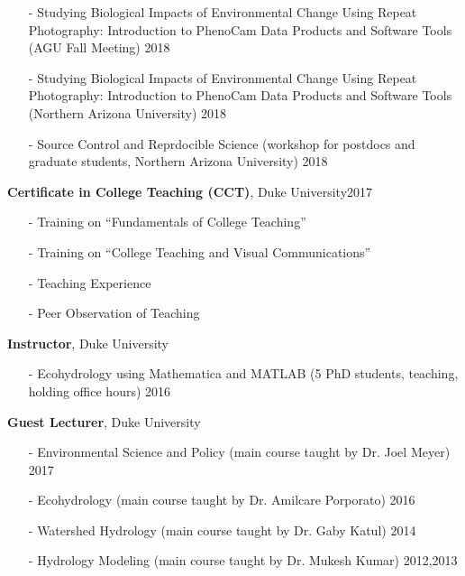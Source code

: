 \documentclass[10pt]{article}
\newenvironment{changemargin}[2]{%
  \begin{list}{}{%
    \setlength{\topsep}{0pt}%
    \setlength{\leftmargin}{#1}%
    \setlength{\rightmargin}{#2}%
    \setlength{\listparindent}{\parindent}%
    \setlength{\itemindent}{\parindent}%
    \setlength{\parsep}{\parskip}%
  }%
  \item[]}{\end{list}
}
\newenvironment{body} {
	\vspace*{-2pt}
	\begin{changemargin}{-0.5in}{-0.5in}
  }
	{\end{changemargin}
}
\begin{document}
\begin{body}
\begin{itemize}
  		\item[-]Studying Biological Impacts of Environmental Change Using Repeat Photography: Introduction to PhenoCam Data Products and Software Tools (AGU Fall Meeting)  \hfill {2018}
  		
  		\item[-]Studying Biological Impacts of Environmental Change Using Repeat Photography: Introduction to PhenoCam Data Products and Software Tools (Northern Arizona University)  \hfill {2018}
  		
  		\item[-]Source Control and Reprdocible Science (workshop for postdocs and graduate students, Northern Arizona University)  \hfill {2018}
  	\end{itemize}
\medskip


	\textbf{Certificate in College Teaching (CCT)}, Duke University\hfill {2017}\\
		\vspace*{-4pt}
		\begin{itemize} \itemsep -0pt
  		\item[-]Training on ``Fundamentals of College Teaching''\\
  		\item[-]Training on ``College Teaching and Visual Communications''\\
      \item[-]Teaching Experience
      \item[-]Peer Observation of Teaching \\
  	\end{itemize}

	\medskip


  \textbf {Instructor}, Duke University\\
	\vspace*{-4pt}
		\begin{itemize} \itemsep -0pt
  		\item[-]Ecohydrology using Mathematica and MATLAB (5 PhD students, teaching, holding office hours)  \hfill {2016}
  	\end{itemize}
\medskip

  \textbf {Guest Lecturer}, Duke University\\
	\vspace*{-4pt}
		\begin{itemize} \itemsep -0pt
		
		  \item[-]Environmental Science and Policy (main course taught by Dr. Joel Meyer)  \hfill {2017}
  		\item[-]Ecohydrology (main course taught by Dr. Amilcare Porporato)  \hfill {2016}
  		\item[-]Watershed Hydrology (main course taught by Dr. Gaby Katul)  \hfill {2014}
  		\item[-]Hydrology Modeling (main course taught by Dr. Mukesh Kumar)  \hfill {2012,2013}
  	\end{itemize}
\medskip



\end{body}
\end{document}
